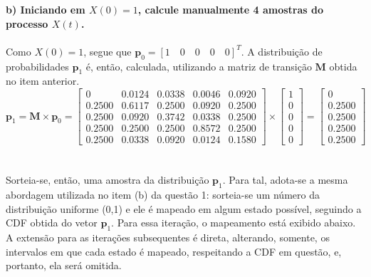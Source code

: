 \documentclass{report}
\begin{document}

\textbf{b) Iniciando em $X(0) = 1$, calcule manualmente 4 amostras do processo $X(t)$.}\\

\paragraph{} Como $X(0) = 1$, segue que $\mathbf{p}_0 = [1 \quad 0 \quad 0 \quad 0 \quad 0]^T$. A distribuição de probabilidades $\mathbf{p}_1$ é, então, calculada, utilizando a matriz de transição $\mathbf{M}$ obtida no item anterior.\\

\begin{equation*}
\mathbf{p}_1 = \mathbf{M} \times \mathbf{p}_0 = \left[ 
\begin{array}{ccccc}
0 & 0.0124 & 0.0338 & 0.0046 & 0.0920 \\ 
0.2500 & 0.6117 & 0.2500 & 0.0920 & 0.2500 \\ 
0.2500 & 0.0920 & 0.3742 & 0.0338 & 0.2500 \\ 
0.2500 & 0.2500 & 0.2500 & 0.8572 & 0.2500 \\ 
0.2500 & 0.0338 & 0.0920 & 0.0124 & 0.1580
\end{array} \right] \times \left[\begin{array}{c}
1 \\ 
0 \\ 
0 \\ 
0 \\ 
0
\end{array} \right] =  \left[\begin{array}{c}
0 \\ 
0.2500 \\ 
0.2500 \\ 
0.2500 \\ 
0.2500
\end{array} \right]
\end{equation*}\\

\paragraph{} Sorteia-se, então, uma amostra da distribuição $\mathbf{p}_1$. Para tal, adota-se a mesma abordagem utilizada no item (b) da questão 1: sorteia-se um número da distribuição uniforme (0,1) e ele é mapeado em algum estado possível, seguindo a CDF obtida do vetor $\mathbf{p}_1$. Para essa iteração, o mapeamento está exibido abaixo. A extensão para as iterações subsequentes é direta, alterando, somente, os intervalos em que cada estado é mapeado, respeitando a CDF em questão, e, portanto, ela será omitida.\\
\end{document}
